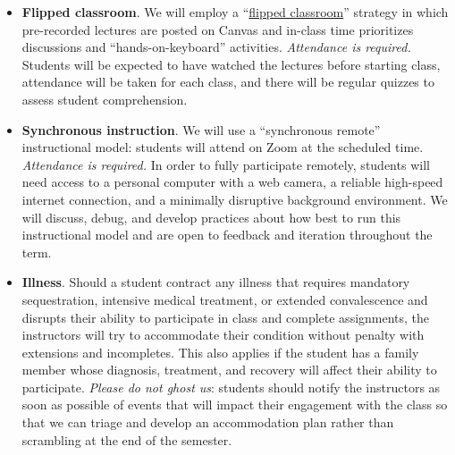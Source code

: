 \documentclass[10pt]{memoir}
\begin{document}
\begin{itemize}[itemsep=0pt,leftmargin=1em]
    
    \item \textbf{Flipped classroom}. We will employ a ``\href{https://en.wikipedia.org/wiki/Flipped_classroom}{flipped classroom}'' strategy in which pre-recorded lectures are posted on Canvas and in-class time prioritizes discussions and ``hands-on-keyboard'' activities. \textit{Attendance is required.} Students will be expected to have watched the lectures before starting class, attendance will be taken for each class, and there will be regular quizzes to assess student comprehension.
    
    
    \item \textbf{Synchronous instruction}. 
    We will use a ``synchronous remote'' instructional model: students will attend on Zoom at the scheduled time. \textit{Attendance is required.} In order to fully participate remotely, students will need access to a personal computer with a web camera, a reliable high-speed internet connection, and a minimally disruptive background environment. We will discuss, debug, and develop practices about how best to run this instructional model and are open to feedback and iteration throughout the term. %
    
    \item \textbf{Illness}. Should a student contract any illness that requires mandatory sequestration, intensive medical treatment, or extended convalescence and disrupts their ability to participate in class and complete assignments, the instructors will try to accommodate their condition without penalty with extensions and incompletes. This also applies if the student has a family member whose diagnosis, treatment, and recovery will affect their ability to participate. \textit{Please do not ghost us}: students should notify the instructors as soon as possible of events that will impact their engagement with the class so that we can triage and develop an accommodation plan rather than scrambling at the end of the semester.
\end{itemize}
\end{document}
